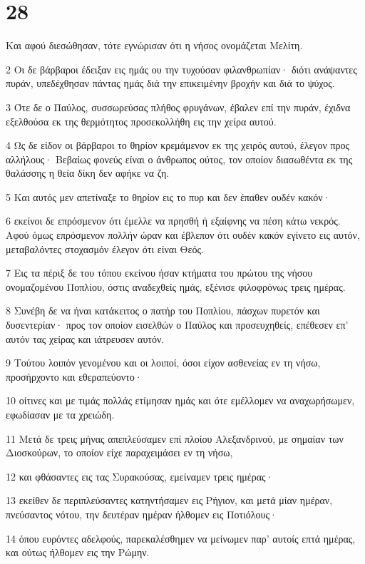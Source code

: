 \chapter{28}

\par Και αφού διεσώθησαν, τότε εγνώρισαν ότι η νήσος ονομάζεται Μελίτη.
\par 2 Οι δε βάρβαροι έδειξαν εις ημάς ου την τυχούσαν φιλανθρωπίαν· διότι ανάψαντες πυράν, υπεδέχθησαν πάντας ημάς διά την επικειμένην βροχήν και διά το ψύχος.
\par 3 Ότε δε ο Παύλος, συσσωρεύσας πλήθος φρυγάνων, έβαλεν επί την πυράν, έχιδνα εξελθούσα εκ της θερμότητος προσεκολλήθη εις την χείρα αυτού.
\par 4 Ως δε είδον οι βάρβαροι το θηρίον κρεμάμενον εκ της χειρός αυτού, έλεγον προς αλλήλους· Βεβαίως φονεύς είναι ο άνθρωπος ούτος, τον οποίον διασωθέντα εκ της θαλάσσης η θεία δίκη δεν αφήκε να ζη.
\par 5 Και αυτός μεν απετίναξε το θηρίον εις το πυρ και δεν έπαθεν ουδέν κακόν·
\par 6 εκείνοι δε επρόσμενον ότι έμελλε να πρησθή ή εξαίφνης να πέση κάτω νεκρός. Αφού όμως επρόσμενον πολλήν ώραν και έβλεπον ότι ουδέν κακόν εγίνετο εις αυτόν, μεταβαλόντες στοχασμόν έλεγον ότι είναι Θεός.
\par 7 Εις τα πέριξ δε του τόπου εκείνου ήσαν κτήματα του πρώτου της νήσου ονομαζομένου Ποπλίου, όστις αναδεχθείς ημάς, εξένισε φιλοφρόνως τρεις ημέρας.
\par 8 Συνέβη δε να ήναι κατάκειτος ο πατήρ του Ποπλίου, πάσχων πυρετόν και δυσεντερίαν· προς τον οποίον εισελθών ο Παύλος και προσευχηθείς, επέθεσεν επ' αυτόν τας χείρας και ιάτρευσεν αυτόν.
\par 9 Τούτου λοιπόν γενομένου και οι λοιποί, όσοι είχον ασθενείας εν τη νήσω, προσήρχοντο και εθεραπεύοντο·
\par 10 οίτινες και με τιμάς πολλάς ετίμησαν ημάς και ότε εμέλλομεν να αναχωρήσωμεν, εφωδίασαν με τα χρειώδη.
\par 11 Μετά δε τρεις μήνας απεπλεύσαμεν επί πλοίου Αλεξανδρινού, με σημαίαν των Διοσκούρων, το οποίον είχε παραχειμάσει εν τη νήσω,
\par 12 και φθάσαντες εις τας Συρακούσας, εμείναμεν τρεις ημέρας·
\par 13 εκείθεν δε περιπλεύσαντες κατηντήσαμεν εις Ρήγιον, και μετά μίαν ημέραν, πνεύσαντος νότου, την δευτέραν ημέραν ήλθομεν εις Ποτιόλους·
\par 14 όπου ευρόντες αδελφούς, παρεκαλέσθημεν να μείνωμεν παρ' αυτοίς επτά ημέρας, και ούτως ήλθομεν εις την Ρώμην.
